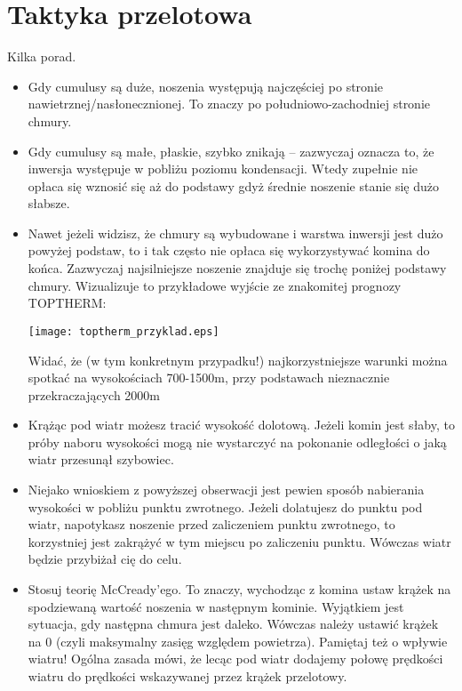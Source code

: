 \documentclass{article}
\begin{document}
\section{Taktyka przelotowa}
Kilka porad.
\begin{itemize}
\item Gdy cumulusy są duże, noszenia występują najczęściej po stronie
    nawietrznej/nasłonecznionej. To znaczy po
    południowo-zachodniej stronie chmury.

\item Gdy cumulusy są małe, płaskie, szybko znikają -- zazwyczaj oznacza
    to, że inwersja występuje w pobliżu poziomu kondensacji. Wtedy zupełnie
    nie opłaca się wznosić się aż do podstawy gdyż średnie noszenie stanie się
    dużo słabsze.

\item Nawet jeżeli widzisz, że chmury są wybudowane i warstwa inwersji jest
    dużo powyżej podstaw, to i tak często nie opłaca się wykorzystywać komina
    do końca. Zazwyczaj najsilniejsze noszenie znajduje się trochę poniżej
    podstawy chmury. Wizualizuje to przykładowe wyjście ze znakomitej
    prognozy TOPTHERM:
    \begin{center}
    \texttt{[image: toptherm\_przyklad.eps]}
    \end{center}
    \noindent
    Widać, że (w tym konkretnym przypadku!) najkorzystniejsze warunki
    można spotkać na wysokościach 700-1500m, przy podstawach
    nieznacznie przekraczających 2000m

\item Krążąc pod wiatr możesz tracić wysokość dolotową. Jeżeli komin jest
    słaby, to próby naboru wysokości mogą nie wystarczyć na pokonanie
    odległości o jaką wiatr przesunął szybowiec. 

\item Niejako wnioskiem z powyższej obserwacji jest pewien sposób nabierania
    wysokości w pobliżu punktu zwrotnego. Jeżeli dolatujesz do punktu
    pod wiatr, napotykasz noszenie przed zaliczeniem punktu zwrotnego,
    to korzystniej jest zakrążyć w tym miejscu po zaliczeniu punktu.
    Wówczas wiatr będzie przybiżał cię do celu.

\item Stosuj teorię McCready'ego. To znaczy, wychodząc z komina ustaw krążek
    na spodziewaną wartość noszenia w następnym kominie. Wyjątkiem jest
    sytuacja, gdy następna chmura jest daleko. Wówczas należy ustawić
    krążek na 0 (czyli maksymalny zasięg względem powietrza).
    Pamiętaj też o wpływie wiatru!
    Ogólna zasada mówi, że lecąc pod wiatr dodajemy połowę prędkości
    wiatru do prędkości wskazywanej przez krążek przelotowy.


\end{itemize}
\end{document}
